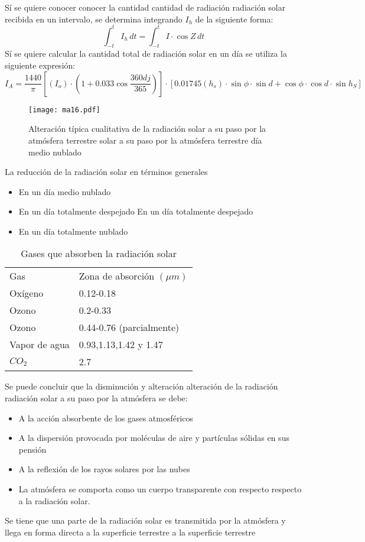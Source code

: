 Sí se quiere conocer conocer la cantidad cantidad de radiación radiación solar recibida en un intervalo, se determina integrando $I_h$ de la siguiente forma: 
\begin{equation}
    \int_{ -t}^t I_h\, dt = \int_{ - t}^t I \cdot \cos{Z}\, dt 
\end{equation}
Sí se quiere calcular la cantidad total de radiación solar en un día se utiliza la siguiente expresión:
\begin{equation}
    I_A = \frac{1440}{\pi}\left[\left(I_o\right) \cdot\left(1 +0.033\cos{\frac{360dj}{365}}  \right) \right]\cdot \left[0.01745(h_s) \cdot \sin{\phi} \cdot \sin{d} + \cos{\phi} \cdot \cos{d} \cdot \sin{h_S} \right]
\end{equation}
\begin{figure}[h!]
\centering
  \texttt{[image: ma16.pdf]}
  \caption{Alteración típica cualitativa de la radiación solar a su paso por la atmósfera terrestre solar a su paso por la atmósfera terrestre día medio nublado}
  \label{ma16}
\end{figure}
La reducción de la radiación solar en términos generales
\begin{itemize}
    \item En un día medio nublado
    \item En un día totalmente despejado En un día totalmente despejado
    \item En un día totalmente nublado
\end{itemize}
\begin{table}[h!]
    \centering
    \begin{tabular}{ll}
    Gas           & Zona de absorción $(\mu m)$ \\
    Oxígeno       & 0.12-0.18                   \\
    Ozono         & 0.2-0.33                    \\
    Ozono         & 0.44-0.76 (parcialmente)    \\
    Vapor de agua & 0.93,1.13,1.42 y 1.47       \\
    $CO_2$        & 2.7                        
    \end{tabular}
    \caption{Gases que absorben la radiación solar}
    \label{tabma11}
\end{table}
Se puede concluir que la disminución y alteración alteración de la radiación radiación solar a su paso por la atmósfera se debe:
\begin{itemize}
    \item A la acción absorbente de los gases atmosféricos
    \item A la dispersión provocada por moléculas de aire y partículas sólidas en sus pensión
    \item A la reflexión de los rayos solares por las nubes
    \item La atmósfera se comporta como un cuerpo transparente con respecto respecto a la radiación solar.
\end{itemize}
Se tiene que una parte de la radiación solar es transmitida por la atmósfera y llega en forma directa a la superficie terrestre a la superficie terrestre

